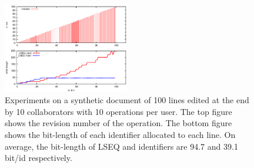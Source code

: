 \begin{figure}
\centering
\includegraphics[width=0.49\textwidth]{img/tenusers.eps}
\caption{Experiments on a synthetic document of 100 lines edited at the end by
  10 collaborators with 10 operations per user. The top figure shows the
  revision number of the operation. The bottom figure shows the bit-length of
  each identifier allocated to each line. On average, the bit-length of LSEQ
  and \NAME{} identifiers are 94.7 and 39.1 bit/id respectively.}
\label{im:tenusers}
\end{figure}



